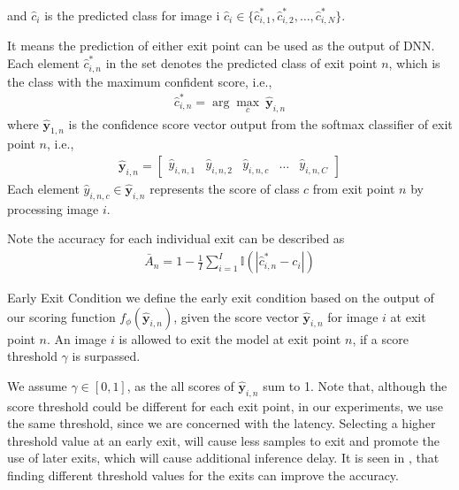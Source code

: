 \begin{enumdescript}
		and $ \hat{c}_i $ is the predicted class for image i $  \hat{c}_i \in \{\hat{c}^*_{i,1} , \hat{c}^*_{i,2}, \dots, \hat{c}^*_{i,N} \} $. 
		
		It means the prediction of either exit point can be used as the output of DNN. Each element $ \hat{c}^*_{i,n} $ in the set denotes the predicted class of exit point $ n $, which is the class with the maximum confident score, i.e.,
		\begin{align}
		\hat{c}^*_{i,n} = \arg \underset{c}{\max}\: \bm{\hat{y}}_{i,n}
		\end{align}
		where $ \bm{\hat{y}}_{1,n} $ is the confidence score vector output from the softmax classifier of exit point $ n $, i.e.,
		\begin{align}
		\bm{\hat{y}}_{i,n} = \left[\begin{array}{ccccc}\hat{y}_{i,n,1} & \hat{y}_{i,n,2} & \hat{y}_{i,n,c} & \dots & \hat{y}_{i,n,C}\end{array}\right]
		\end{align}
		Each element $ \hat{y}_{i,n,c} \in \bm{\hat{y}}_{i,n} $ represents the score of class $ c $ from exit point $ n $ by processing image $ i $.
		
		Note the accuracy for each individual exit can be described as
		\begin{align}
		\bar{A}_n=1-\frac{1}{I} \sum_{i=1}^{I} \mathbb{I}\left(\left|\hat{c}^*_{i,n}-c_{i}\right|\right)
		\end{align}
  
		\item[Early Exit Condition] we define the early exit condition based on the output of our scoring function $ f_\phi(\bm{\hat{y}}_{i,n}) $, given the score vector $ \bm{\hat{y}}_{i,n} $ for image $ i $ at exit point $ n $. An image $ i $ is allowed to exit the model at exit point $ n $, if a score threshold $ \gamma $ is surpassed. 
		
		We assume $	\gamma \in \left[0,1\right] $, as the all scores of  $ \bm{\hat{y}}_{i,n} $ sum to 1. Note that, although the score threshold could be different for each exit point, in our experiments, we use the same threshold, since we are concerned with the latency. Selecting a higher threshold value at an early exit, will cause less samples to exit and promote the use of later exits, which will cause additional inference delay. It is seen in \cite{teerapittayanon_finding_2018}, that finding different threshold values for the exits can improve the accuracy.
		

\end{enumdescript}
